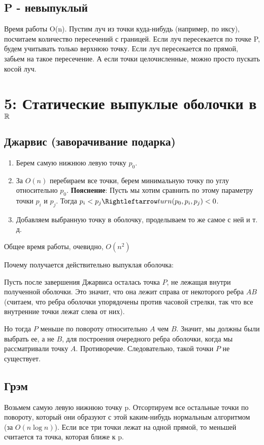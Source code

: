 \documentclass[11pt]{article}
\begin{document}
\subsection{P - невыпуклый}
\label{sec:orgheadline20}
Время работы O(n). Пустим луч из точки куда-нибудь (например, по
иксу), посчитаем количество пересечений с границей.  Если луч
пересекается по точке P, будем учитывать только верхнюю точку. Если
луч пересекается по прямой, забьем на такое пересечение. А если
точки целочисленные, можно просто пускать косой луч.

\section{{\bfseries{}} 5:  Статические выпуклые оболочки в \(\mathbb{R}\)}
\label{sec:orgheadline29}
\subsection{{\bfseries{}} Джарвис (заворачивание подарка)}
\label{sec:orgheadline22}
\begin{enumerate}
\item Берем самую нижнюю левую точку \(p_0\).
\item За \(O(n)\) перебираем все точки, берем минимальную точку по углу относительно \(p_0\).
\textbf{Пояснение}: Пусть мы хотим сравнить по этому параметру точки \(p_i\) и \(p_j\).
Тогда \(p_i < p_j \Rightleftarrow turn(p_0, p_i, p_j) < 0\).
\item Добавляем выбранную точку в оболочку, проделываем то же самое с ней и т. д.
\end{enumerate}

Общее время работы, очевидно, \(O(n^2)\)

Почему получается действительно выпуклая оболочка:

Пусть после завершения Джарвиса осталась точка \(P\), не лежащая внутри
полученной оболочки. Это значит, что она лежит справа от некоторого ребра \(AB\)
(считаем, что ребра оболочки упорядочены против часовой стрелки, так что все внутренние
точки лежат слева от них).

Но тогда \(P\) меньше по повороту относительно \(A\) чем \(B\).
Значит, мы должны были выбрать ее, а не \(B\), для построения очередного ребра оболочки,
когда мы рассматривали точку \(A\). Противоречие. Следовательно, такой точки \(P\) не существует.
\subsection{{\bfseries{}} Грэм}
\label{sec:orgheadline23}
Возьмем самую левую нижнюю точку p. Отсортируем все остальные точки по повороту,
который они образуют с этой каким-нибудь нормальным алгоритмом (за \(O(n \log n)\)).
Если все три точки лежат на одной прямой, то меньшей считается та точка, которая ближе к p.
\end{document}
